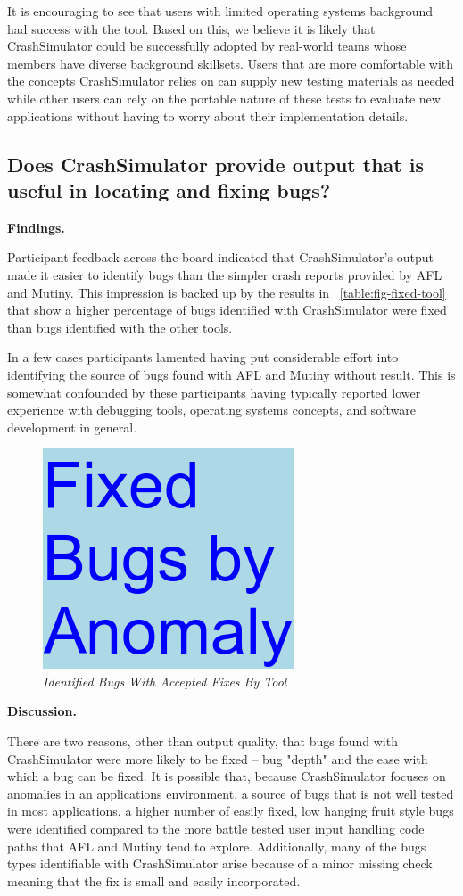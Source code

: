 It is encouraging to see that users with limited operating systems
background had success
with the tool.  Based on this, we believe it is likely that CrashSimulator
could be successfully adopted by real-world teams whose members have
diverse background skillsets.  Users that are more comfortable with the
concepts CrashSimulator relies on can supply new testing materials as
needed while other users can rely on the portable nature of
these tests to evaluate new applications without
having to worry about their implementation details.


\subsection{Does CrashSimulator provide output that is useful in locating
and fixing bugs?}


{\bf Findings. }

Participant feedback across the board indicated that CrashSimulator's
output made it easier to identify bugs than the simpler crash reports
provided by AFL and Mutiny.  This impression is backed up by the results in
~\ref{table:fig-fixed-tool} that
show a higher percentage of bugs identified with
CrashSimulator were fixed than bugs identified with the other tools.

In a few cases participants lamented having put considerable effort into
identifying the source of bugs found with AFL and Mutiny without result.
This is somewhat confounded by these participants having typically reported
lower experience with debugging tools, operating systems concepts, and
software development in general.


\begin{figure}[t]
  \center{}
  \includegraphics[scale=.5]{images/table3}
  \caption{\emph{Identified Bugs With Accepted Fixes By Tool}}
  \label{fig-fixed-tool}
\end{figure}


{\bf Discussion. }

There are two reasons, other than output quality, that bugs found with
CrashSimulator were more likely to be fixed -- bug "depth" and the ease
with which a bug can be fixed.  It is possible that, because CrashSimulator
focuses on anomalies in an applications environment, a source of bugs that
is not well tested in most applications, a higher number of easily fixed,
low
hanging fruit style bugs were identified compared to the more battle tested
user input handling code paths that AFL and Mutiny tend to explore.
Additionally, many of the bugs types identifiable with CrashSimulator arise
because of a minor missing check meaning that the fix is small and easily
incorporated.
